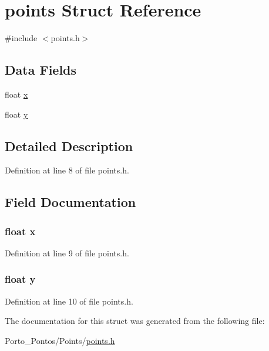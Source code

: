 \hypertarget{structpoints}{}\section{points Struct Reference}
\label{structpoints}


{\ttfamily \#include $<$points.\+h$>$}

\subsection*{Data Fields}
\begin{DoxyCompactItemize}
\item 
float \hyperlink{structpoints_ad0da36b2558901e21e7a30f6c227a45e}{x}
\item 
float \hyperlink{structpoints_aa4f0d3eebc3c443f9be81bf48561a217}{y}
\end{DoxyCompactItemize}


\subsection{Detailed Description}


Definition at line 8 of file points.\+h.



\subsection{Field Documentation}
\hypertarget{structpoints_ad0da36b2558901e21e7a30f6c227a45e}{}
\subsubsection[{x}]{\setlength{\rightskip}{0pt plus 5cm}float x}\label{structpoints_ad0da36b2558901e21e7a30f6c227a45e}


Definition at line 9 of file points.\+h.

\hypertarget{structpoints_aa4f0d3eebc3c443f9be81bf48561a217}{}
\subsubsection[{y}]{\setlength{\rightskip}{0pt plus 5cm}float y}\label{structpoints_aa4f0d3eebc3c443f9be81bf48561a217}


Definition at line 10 of file points.\+h.



The documentation for this struct was generated from the following file\+:\begin{DoxyCompactItemize}
\item 
Porto\+\_\+\+Pontos/\+Points/\hyperlink{points_8h}{points.\+h}\end{DoxyCompactItemize}
